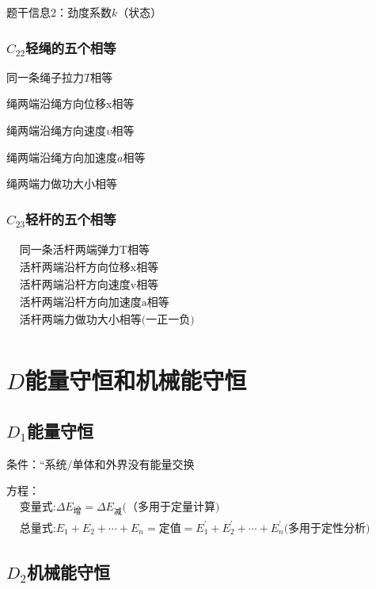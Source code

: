 \documentclass[lang=cn,10pt]{elegantbook}
\begin{document}
		      题干信息2：劲度系数$k$（状态）
		      
		      \subsubsection{$C_{22} $轻绳的五个相等}
		      
		      同一条绳子拉力$T$相等
		      
		      绳两端沿绳方向位移x相等
		      
		      绳两端沿绳方向速度$\upsilon$相等
		      
		      绳两端沿绳方向加速度$a$相等
		      
		      绳两端力做功大小相等
		      \subsubsection{$C_{23} $轻杆的五个相等}
		      
		      $\begin{aligned}
		      	&\text{同一条活}\text{杆两端弹力T相等} \\
		      	&\text{活杆两端}\text{沿杆方向位移x相等} \\
		      	&\text{活杆两端}\text{沿杆方向速度v相等} \\
		      	&\text{活杆两端} \text{沿杆方向加速度a相等} \\
		      	&\text{活杆两端力做功大小相等(一正一负)} \\
		      \end{aligned}$
		      
		      \section{$D$能量守恒和机械能守恒}
		      \subsection{$D_1$能量守恒}
		      
		      条件：$\text{“系统/单体和外界没有能量交换}$
		      
		      方程：$ \begin{aligned}&\text{变量式:}\Delta E_\text{增}=\Delta E_\text{减}(\text{（多用于定量计算)}\\&\text{总量式:}E_1+E_2+\cdots+E_n=\text{定值}=E_1^{\prime}+E_2^{\prime}+\cdots+E_n^{\prime}\text{(多用于定性分析)}\end{aligned}$
		      
		      \subsection{$D_2$机械能守恒}
		      
\end{document}
